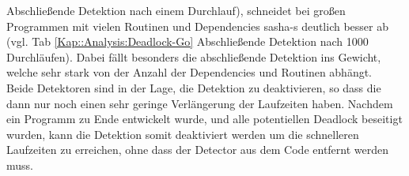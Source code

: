 Abschließende Detektion nach einem Durchlauf), schneidet bei großen Programmen 
mit vielen Routinen und Dependencies sasha-s deutlich besser ab (vgl. Tab \ref{Kap::Analysis:Deadlock-Go}
Abschließende Detektion nach 1000 Durchläufen). Dabei fällt besonders 
die abschließende Detektion ins Gewicht, welche sehr stark von der Anzahl der 
Dependencies und Routinen abhängt.\\
Beide Detektoren sind in der Lage, die Detektion zu deaktivieren, so dass die 
dann nur noch 
einen sehr geringe Verlängerung der Laufzeiten haben. Nachdem ein Programm 
zu Ende entwickelt wurde, und alle potentiellen Deadlock beseitigt wurden, 
kann die Detektion somit deaktiviert werden um die schnelleren Laufzeiten zu erreichen,
ohne dass der Detector aus dem Code entfernt werden muss.
 



